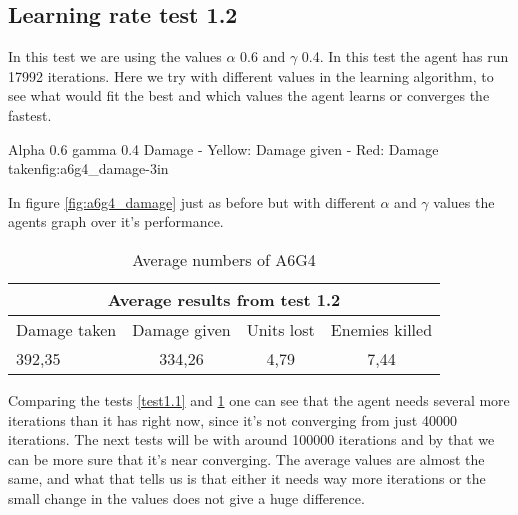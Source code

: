 \subsection*{Learning rate test 1.2}
In this test we are using the values $\alpha$ 0.6 and $\gamma$ 0.4. In this test the agent has run 17992 iterations. Here we try with different values in the learning algorithm, to see what would fit the best and which values the agent learns or converges the fastest.


			{Alpha 0.6 gamma 0.4 Damage - Yellow: Damage given - Red: Damage taken}{fig:a6g4_damage}{-3in}

In figure \ref{fig:a6g4_damage} just as before but with different $\alpha$ and $\gamma$ values the agents graph over it's performance.






\begin{centering}
\begin{table}
 \begin{tabular}{|l|c|c|c|}
	\multicolumn{4}{c}{Average results from test 1.2} \\
	\hline
		Damage taken & Damage given & Units lost & Enemies killed\\
	\hline
		392,35 & 334,26 & 4,79 & 7,44 \\
	\hline
\end{tabular}
\caption{Average numbers of A6G4}
\label{test1.2}
\end{table}
\end{centering}





Comparing the tests \ref{test1.1} and \ref{test1.2} one can see that the agent needs several more iterations than it has right now, since it's not converging from just 40000 iterations. The next tests will be with around 100000 iterations and by that we can be more sure that it's near converging. The average values are almost the same, and what that tells us is that either it needs way more iterations or the small change in the values does not give a huge difference.








